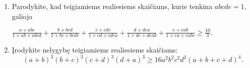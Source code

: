 \begin{enumerate}
  \item {} Parodykite, kad teigiamiems
    realiesiems skaičiams, kurie tenkina $abcde=1$, galioja
    \begin{center}
      $\frac{a+abc}{1+ab+abcd}+\frac{b+bcd}{1+bc+bcde}+\frac{c+cde}{1+cd+cdea}+\frac{d+dea}{1+de+deab}+\frac{e+eab}{1+ea+eabc}\geq\frac{10}{3}.$
    \end{center}
  \item {} Įrodykite
    nelygybę teigiamiems realiesiems skaičiams:
    $$(a+b)^3(b+c)^3(c+d)^3(d+a)^3\geq16a^2b^2c^2d^2(a+b+c+d)^4.$$

\end{enumerate}

